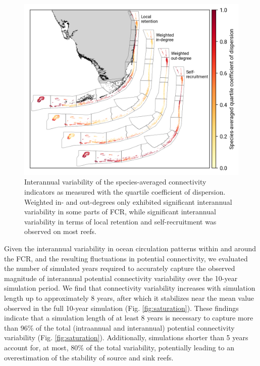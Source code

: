 \documentclass[preprint,12pt,authoryear]{elsarticle}
\begin{document}
	\begin{figure}
		\centering
		\includegraphics[width=\textwidth]{figures/species_averaged_quartile_coefficient_of_dispersion.png}
		\caption{Interannual variability of the species-averaged connectivity indicators as measured with the quartile coefficient of dispersion. Weighted in- and out-degrees only exhibited significant interannual variability in some parts of FCR, while significant interannual variability in terms of local retention and self-recruitment was observed on most reefs.
		}\label{fig:variability}
		
	\end{figure}
	
	Given the interannual variability in ocean circulation patterns within and around the FCR, and the resulting fluctuations in potential connectivity, we evaluated the number of simulated years required to accurately capture the observed magnitude of interannual potential connectivity variability over the 10-year simulation period. We find that connectivity variability increases with simulation length up to approximately 8 years, after which it stabilizes near the mean value observed in the full 10-year simulation (Fig. \ref{fig:saturation}). These findings indicate that a simulation length of at least 8 years is necessary to capture more than 96\% of the total (intraannual and interannual) potential connectivity variability (Fig. \ref{fig:saturation}). Additionally, simulations shorter than 5 years account for, at most, 80\% of the total variability, potentially leading to an overestimation of the stability of source and sink reefs.
	
\end{document}
